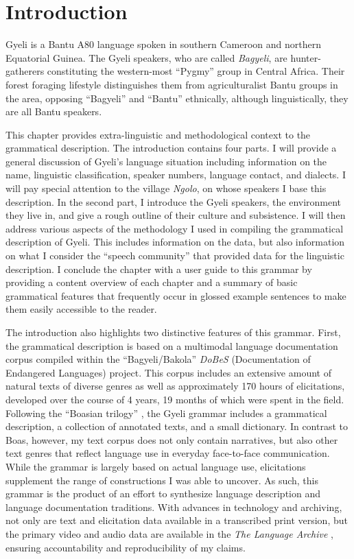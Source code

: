 \chapter{Introduction}
\label{sec:Introduction}


Gyeli is a Bantu A80 language spoken in southern Cameroon and northern Equatorial Guinea.  
The Gyeli speakers, who are called \textit{Bagyeli}, are hunter-gatherers constituting the western-most ``Pygmy'' group in Central Africa. Their forest foraging lifestyle  distinguishes them from agriculturalist Bantu groups in the area, opposing ``Bagyeli'' and ``Bantu'' ethnically, although linguistically, they are all Bantu speakers.

This chapter provides extra-linguistic and methodological context to the grammatical description. The introduction contains four parts. I will provide a general discussion of Gyeli's language situation including information on the name, linguistic classification, speaker numbers, language contact, and dialects. I will pay special attention to the village \textit{Ngolo}, on whose speakers I base this description.  In the second part, I introduce the Gyeli speakers, the environment they live in, and give a rough outline of their culture and subsistence. I will then address various aspects of the methodology I used in compiling the grammatical description of Gyeli. This includes information on the data, but also information on what I consider the ``speech community'' that provided data for the linguistic description. I conclude the chapter with a user guide to this grammar by providing a content overview of each chapter and a summary of basic grammatical features that frequently occur in glossed example sentences to make them easily accessible to the reader. 

The introduction also highlights two distinctive features of this grammar.  First, the grammatical description is based on a multimodal language documentation corpus compiled within the ``Bagyeli/Bakola'' {\itshape DoBeS} (Documentation of Endangered Languages) project.  This corpus includes an extensive amount of natural texts of diverse genres as well as approximately 170 hours of elicitations, developed over the course of 4 years, 19 months of which were spent in the field. Following the ``Boasian trilogy'' \citep{evans2006}, the Gyeli grammar includes a grammatical description, a collection of annotated texts, and a small dictionary. In contrast to Boas, however, my text corpus does not only contain narratives, but also other text genres that reflect language use in everyday face-to-face communication.  While the grammar is largely based on actual language use, elicitations supplement the range of constructions I was able to uncover. As such, this grammar is the product of an effort to synthesize language description and language documentation traditions. With advances in technology and archiving, not only are text and elicitation data available in a transcribed print version, but the primary video and audio data are available in the {\itshape The Language Archive} \citep{grimm2020a}, ensuring accountability and reproducibility of my claims.

